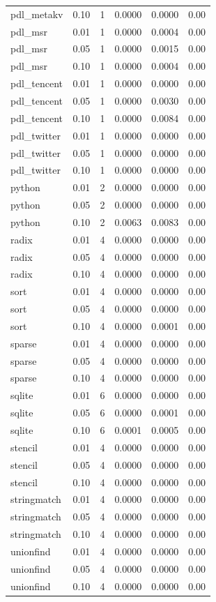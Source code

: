 \begin{tabular}{lcrrrr}
pdl\_metakv & 0.10 & 1 & 0.0000 & 0.0000 & 0.00 \\
pdl\_msr & 0.01 & 1 & 0.0000 & 0.0004 & 0.00 \\
pdl\_msr & 0.05 & 1 & 0.0000 & 0.0015 & 0.00 \\
pdl\_msr & 0.10 & 1 & 0.0000 & 0.0004 & 0.00 \\
pdl\_tencent & 0.01 & 1 & 0.0000 & 0.0000 & 0.00 \\
pdl\_tencent & 0.05 & 1 & 0.0000 & 0.0030 & 0.00 \\
pdl\_tencent & 0.10 & 1 & 0.0000 & 0.0084 & 0.00 \\
pdl\_twitter & 0.01 & 1 & 0.0000 & 0.0000 & 0.00 \\
pdl\_twitter & 0.05 & 1 & 0.0000 & 0.0000 & 0.00 \\
pdl\_twitter & 0.10 & 1 & 0.0000 & 0.0000 & 0.00 \\
python & 0.01 & 2 & 0.0000 & 0.0000 & 0.00 \\
python & 0.05 & 2 & 0.0000 & 0.0000 & 0.00 \\
python & 0.10 & 2 & 0.0063 & 0.0083 & 0.00 \\
radix & 0.01 & 4 & 0.0000 & 0.0000 & 0.00 \\
radix & 0.05 & 4 & 0.0000 & 0.0000 & 0.00 \\
radix & 0.10 & 4 & 0.0000 & 0.0000 & 0.00 \\
sort & 0.01 & 4 & 0.0000 & 0.0000 & 0.00 \\
sort & 0.05 & 4 & 0.0000 & 0.0000 & 0.00 \\
sort & 0.10 & 4 & 0.0000 & 0.0001 & 0.00 \\
sparse & 0.01 & 4 & 0.0000 & 0.0000 & 0.00 \\
sparse & 0.05 & 4 & 0.0000 & 0.0000 & 0.00 \\
sparse & 0.10 & 4 & 0.0000 & 0.0000 & 0.00 \\
sqlite & 0.01 & 6 & 0.0000 & 0.0000 & 0.00 \\
sqlite & 0.05 & 6 & 0.0000 & 0.0001 & 0.00 \\
sqlite & 0.10 & 6 & 0.0001 & 0.0005 & 0.00 \\
stencil & 0.01 & 4 & 0.0000 & 0.0000 & 0.00 \\
stencil & 0.05 & 4 & 0.0000 & 0.0000 & 0.00 \\
stencil & 0.10 & 4 & 0.0000 & 0.0000 & 0.00 \\
stringmatch & 0.01 & 4 & 0.0000 & 0.0000 & 0.00 \\
stringmatch & 0.05 & 4 & 0.0000 & 0.0000 & 0.00 \\
stringmatch & 0.10 & 4 & 0.0000 & 0.0000 & 0.00 \\
unionfind & 0.01 & 4 & 0.0000 & 0.0000 & 0.00 \\
unionfind & 0.05 & 4 & 0.0000 & 0.0000 & 0.00 \\
unionfind & 0.10 & 4 & 0.0000 & 0.0000 & 0.00 \\
\bottomrule
\end{tabular}
